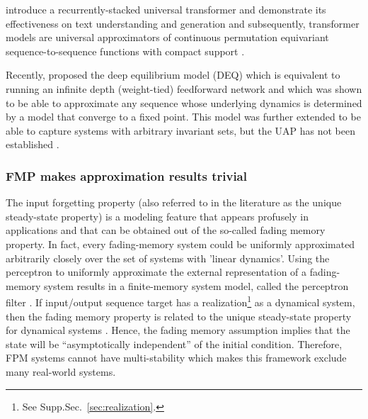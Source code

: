 \documentclass{article}
\theoremstyle{definition}
\theoremstyle{remark}
\newcounter{ct}
\begin{document}

 \citet{dehghani2018universal} introduce a recurrently-stacked universal transformer and demonstrate its effectiveness on text understanding and generation and subsequently, transformer models are universal approximators of continuous permutation equivariant sequence-to-sequence functions with compact support \citep{yun2019transformers}.


Recently, \citet{bai2019deq} proposed the deep equilibrium model (DEQ) which is equivalent to running an infinite depth (weight-tied) feedforward network and which was shown to be able to approximate any sequence whose underlying dynamics is determined by a model that converge to a fixed point.
This model was further extended to be able to capture systems with arbitrary invariant sets, but the UAP has not been established \citep{konishi2023stable}. %


\subsubsection{FMP makes approximation results trivial} %
 The input forgetting property (also referred to in the literature as the unique steady-state property) is a modeling feature that appears profusely in applications and that can be obtained out of the so-called fading memory property.
In fact, every fading-memory system could be uniformly approximated arbitrarily closely over the set of systems with 'linear dynamics'\citep{matthews1993approximating}. %
Using the perceptron to uniformly approximate the external representation of a fading-memory system results in a finite-memory system model, called the perceptron filter \citep{matthews1993approximating}.
%
If  input/output sequence target has a realization\footnote{See Supp.Sec.~\ref{sec:realization}.} as a dynamical system, then the fading memory property is related to the unique steady-state property for dynamical systems \citep{chua1976qualitative}.
Hence, the fading memory assumption implies that the state will be “asymptotically independent” of the initial condition.
Therefore, FPM systems cannot have multi-stability which makes this framework exclude many real-world systems.
\end{document}
